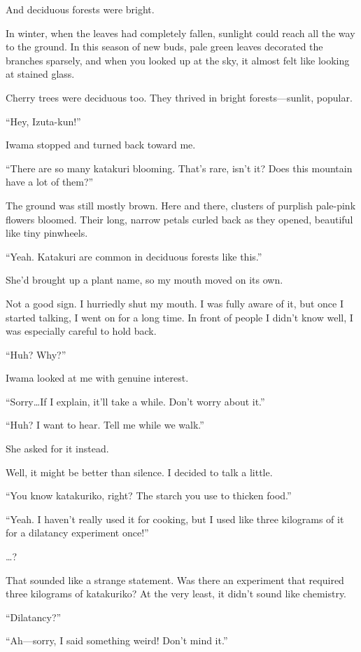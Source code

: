 \documentclass[
    a4paper,
    12pt,
    twoside,
    openany,
    UTF8,
    fontset=windows
]{ctexbook}
\begin{document}
And deciduous forests were bright.

In winter, when the leaves had completely fallen, sunlight could reach all the way to the ground. In this season of new buds, pale green leaves decorated the branches sparsely, and when you looked up at the sky, it almost felt like looking at stained glass.

Cherry trees were deciduous too. They thrived in bright forests---sunlit, popular.

``Hey, Izuta-kun!''

Iwama stopped and turned back toward me.

``There are so many katakuri blooming. That's rare, isn't it? Does this mountain have a lot of them?''

The ground was still mostly brown. Here and there, clusters of purplish pale-pink flowers bloomed. Their long, narrow petals curled back as they opened, beautiful like tiny pinwheels.

``Yeah. Katakuri are common in deciduous forests like this.''

She'd brought up a plant name, so my mouth moved on its own.

Not a good sign. I hurriedly shut my mouth. I was fully aware of it, but once I started talking, I went on for a long time. In front of people I didn't know well, I was especially careful to hold back.

``Huh? Why?''

Iwama looked at me with genuine interest.

``Sorry\dots If I explain, it'll take a while. Don't worry about it.''

``Huh? I want to hear. Tell me while we walk.''

She asked for it instead.

Well, it might be better than silence. I decided to talk a little.

``You know katakuriko, right? The starch you use to thicken food.''

``Yeah. I haven't really used it for cooking, but I used like three kilograms of it for a dilatancy experiment once!''

\dots?

That sounded like a strange statement. Was there an experiment that required three kilograms of katakuriko? At the very least, it didn't sound like chemistry.

``Dilatancy?''

``Ah---sorry, I said something weird! Don't mind it.''
\end{document}
